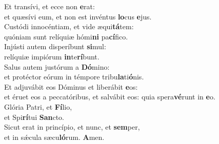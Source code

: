 \evenverse Et transívi, et ecce non \textbf{e}rat:~\*\\
\evenverse et quæsívi eum, et non est invéntus \textbf{lo}cus \textbf{e}jus.\\
\oddverse Custódi innocéntiam, et vide æqui\textbf{tá}tem:~\*\\
\oddverse quóniam sunt relíquiæ hómi\textbf{ni} pa\textbf{cí}fico.\\
\evenverse Injústi autem disperíbunt \textbf{si}mul:~\*\\
\evenverse relíquiæ impiórum \textbf{in}te\textbf{rí}bunt.\\
\oddverse Salus autem justórum a \textbf{Dó}mino:~\*\\
\oddverse et protéctor eórum in témpore tribu\textbf{la}ti\textbf{ó}nis.\\
\evenverse Et adjuvábit eos Dóminus et liberábit \textbf{e}os:~\*\\
\evenverse et éruet eos a peccatóribus, et salvábit eos: quia spera\textbf{vé}runt in \textbf{e}o.\\
\oddverse Glória Patri, et \textbf{Fí}lio,~\*\\
\oddverse et Spi\textbf{rí}tui \textbf{San}cto.\\
\evenverse Sicut erat in princípio, et nunc, et \textbf{sem}per,~\*\\
\evenverse et in sǽcula sæcu\textbf{ló}rum. \textbf{A}men.\\
